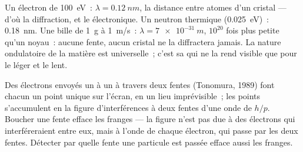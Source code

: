 \begin{example}\label{ex:b1:quantum-introduction:wavelengths}
Un électron de \qty{100}{eV}~: $\lambda = \qty{0.12}{nm}$, la distance entre
atomes d'un cristal --- d'où la diffraction, et le 
électronique. Un neutron thermique (\qty{0.025}{eV})~: \qty{0.18}{nm}. Une
bille de \qty{1}{g} à \qty{1}{m/s}~: $\lambda = \qty{7e-31}{m}$, $10^{20}$ fois
plus petite qu'un noyau~: aucune fente, aucun cristal ne la diffractera
jamais. La nature ondulatoire de la matière est universelle~; c'est sa
 qui ne la rend visible que pour le léger et le lent.
\end{example}

\begin{proposition}\label{prop:b1:quantum-introduction:buildup}
Des électrons envoyés un à un à travers deux fentes (Tonomura, 1989)
font chacun un point unique sur l'écran, en un lieu imprévisible~; les
points s'accumulent en la figure d'interférences à deux fentes d'une onde
de  $h/p$. Boucher une fente efface les franges --- la
figure n'est pas due à des électrons qui interféreraient entre eux, mais à
l'onde de chaque électron, qui passe par les deux fentes. Détecter par
quelle fente une particule est passée efface aussi les franges.
\end{proposition}
\admitted


